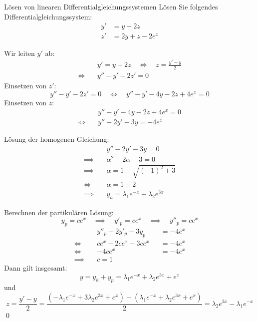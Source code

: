 \documentclass[german]{../spicker}
\begin{document}
\begin{example}{Lösen von linearen Differentialgleichungssystemen}
    Lösen Sie folgendes Differentialgleichungssystem:
    $$
        \begin{aligned}
            y' & = y + 2z          \\
            z' & = 2y + z - 2e^{x}
        \end{aligned}
    $$

    \noindent\makebox[\linewidth]{\rule{\textwidth}{1pt}}

    Wir leiten $y'$ ab:
    $$
        \begin{aligned}
                       & y' = y + 2z \quad \iff \quad z = \frac{y'- y}{2} \\
            \iff \quad & y'' - y'  - 2z' = 0
        \end{aligned}
    $$
    Einsetzen von $z'$:
    $$
        y'' - y'  - 2z' = 0 \quad \iff \quad  y'' - y'  - 4y -2z + 4e^{x} = 0
    $$
    Einsetzen von $z$:
    $$
        \begin{aligned}
                       & y'' - y'  - 4y -2z + 4e^{x} = 0 \\
            \iff \quad & y'' - 2y'  - 3y  = -4e^{x}
        \end{aligned}
    $$

    Lösung der homogenen Gleichung:
    $$
        \begin{aligned}
                           & y'' - 2y'  - 3y  = 0                          \\
            \implies \quad & \alpha^2 - 2\alpha - 3 = 0                    \\
            \implies \quad & \alpha = 1 \pm \sqrt{\left( -1 \right)^2 + 3} \\
            \iff \quad     & \alpha = 1 \pm 2                              \\
            \implies \quad & y_h = \lambda_1e^{-x} + \lambda_2e^{3x}
        \end{aligned}
    $$

    Berechnen der partikulären Lösung:
    $$
        y_p = ce^x \quad \implies \quad y'_p = ce^x \quad \implies \quad y''_p = ce^x
    $$
    $$
        \begin{aligned}
                           & y''_p - 2y'_p  - 3y_p &  & = -4e^{x} \\
            \iff \quad     & ce^x - 2ce^x  - 3ce^x &  & = -4e^{x} \\
            \iff \quad     & -4ce^x                &  & = -4e^{x} \\
            \implies \quad & c = 1
        \end{aligned}
    $$
    Dann gilt insgesamt:
    $$
        y = y_h + y_p = \lambda_1e^{-x} + \lambda_2e^{3x} + e^x
    $$
    und
    $$
        z = \frac{y'- y}{2} = \frac{\left( -\lambda_1e^{-x} + 3\lambda_2e^{3x} + e^x \right) - \left( \lambda_1e^{-x} + \lambda_2e^{3x} + e^x \right)}{2} = \lambda_2e^{3x} - \lambda_1e^{-x}
    $$\qed
\end{example}

\printindex
\printindex[Beispiele]
\end{document}
